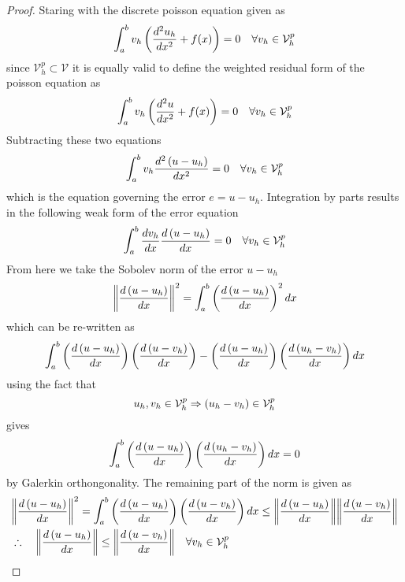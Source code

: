 \begin{proof}
Staring with the discrete poisson equation given as 
\begin{equation*}
\int_{a}^{b} v_{h} \left(  \frac{d^{2} u_{h} }{dx^{2}} + f(x)  \right) = 0 \quad \forall v_{h} \in \mathcal{V}_{h}^{p}
\end{equation*}
since $\mathcal{V}_{h}^{p} \subset \mathcal{V}$ it is equally valid to define the weighted residual form of the poisson equation  as 
\begin{equation*}
\int_{a}^{b} v_{h} \left(  \frac{d^{2} u}{dx^{2}} + f(x)  \right)= 0 \quad \forall v_{h} \in \mathcal{V}_{h}^{p}
\end{equation*}
Subtracting these two equations 
\begin{equation*}
\int_{a}^{b} v_{h} \frac{d^{2} \left( u - u_{h} \right) }{dx^{2}}= 0 \quad \forall v_{h} \in \mathcal{V}_{h}^{p}
\end{equation*}
which is the equation governing the error $e = u - u_{h}$.  Integration by parts results in the following weak form of the error equation
\begin{equation*}
\int_{a}^{b} \frac{d v_{h}}{dx} \frac{d \left( u - u_{h} \right) }{dx}= 0 \quad \forall v_{h} \in \mathcal{V}_{h}^{p}
\end{equation*}
From here we take the Sobolev norm of the error $u - u_{h}$
\begin{equation*}
\biggl \Vert  \frac{ d \left( u - u_{h} \right)}{dx} \biggr \Vert^{2} = \int_{a}^{b} \left(  \frac{ d \left( u - u_{h} \right)}{dx} \right)^{2} dx
\end{equation*}
which can be re-written as 
\begin{equation*}
\int_{a}^{b} \left(  \frac{ d\left( u - u_{h} \right)}{dx} \right) \left( \frac{  d\left( u - v_{h} \right)}{dx} \right) -  \left( \frac{ d\left( u - u_{h} \right)}{dx} \right) \left( \frac{  d\left( u_{h} - v_{h} \right)}{dx} \right) dx
\end{equation*}
using the fact that 
\begin{equation*}
u_{h}, v_{h} \in \mathcal{V}_{h}^{p} \Rightarrow \left( u_{h} - v_{h} \right) \in \mathcal{V}_{h}^{p}
\end{equation*}
gives
\begin{equation*}
\int_{a}^{b} \left( \frac{ d\left( u - u_{h} \right)}{dx} \right) \left( \frac{  d\left( u_{h} - v_{h} \right)}{dx} \right) dx = 0 
\end{equation*} 
by Galerkin orthongonality.  The remaining part of the norm is given as 
\begin{equation*}
\begin{split}
 & \biggl \Vert  \frac{ d \left( u - u_{h} \right)}{dx}  \biggr \Vert^{2} = \int_{a}^{b} \left(  \frac{ d\left( u - u_{h} \right)}{dx} \right) \left( \frac{  d\left( u - v_{h} \right)}{dx} \right) dx \leq \biggl \Vert \frac{d \left( u - u_{h} \right)} {dx} \biggr \Vert \biggl \Vert \frac{d \left( u - v_{h} \right)} {dx} \biggr \Vert \\
 & \therefore \quad \biggl \Vert  \frac{ d \left( u - u_{h} \right)}{dx} \biggr \Vert \leq \biggl \Vert \frac{d \left( u - v_{h} \right)} {dx} \biggr \Vert  \quad \forall v_{h} \in \mathcal{V}_{h}^{p}
 \end{split}  
\end{equation*} 
\end{proof} 

